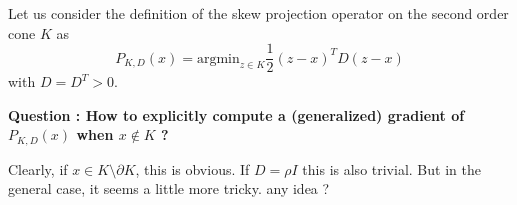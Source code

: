 \documentclass[a4]{article}
\begin{document}
Let us consider the definition of the skew projection operator on the second order cone $K$  as 
\begin{equation}
  P_{K,D} (x)  = \mbox{argmin}_{z \in K} \frac 1 2 (z-x)^T D (z-x)
\end{equation}
with $D=D^T>0$.

{\bf Question : How to explicitly compute a (generalized) gradient of  $P_{K,D} (x)$ when $x \notin K$ ?}

Clearly, if $x \in K \setminus \partial K$, this is obvious.  If $D = \rho I$ this is also trivial. But in the general case, it seems a little more tricky. any idea ?



\end{document}
